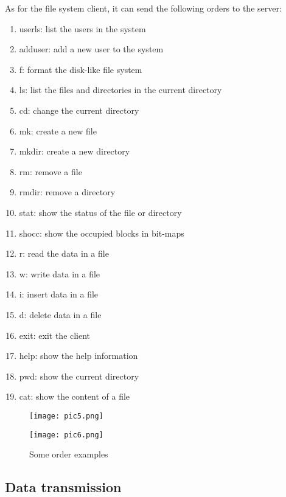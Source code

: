 \documentclass[a4paper]{article}
\begin{document}
As for the file system client, it can send the following orders to the server:
\begin{enumerate}
    \item userls: list the users in the system
    \item adduser: add a new user to the system
    \item f: format the disk-like file system
    \item ls: list the files and directories in the current directory
    \item cd: change the current directory
    \item mk: create a new file
    \item mkdir: create a new directory
    \item rm: remove a file
    \item rmdir: remove a directory
    \item stat: show the status of the file or directory
    \item shocc: show the occupied blocks in bit-maps
    \item r: read the data in a file
    \item w: write data in a file
    \item i: insert data in a file
    \item d: delete data in a file
    \item exit: exit the client
    \item help: show the help information
    \item pwd: show the current directory
    \item cat: show the content of a file
\end{enumerate}
\begin{figure}[h]
    \begin{minipage}[t]{0.5\textwidth}
        \centering
        \texttt{[image: pic5.png]}
        
    \end{minipage}
    \begin{minipage}[t]{0.5\textwidth}
        \centering
        \texttt{[image: pic6.png]}
        
    \end{minipage}
    \caption{Some order examples}
\end{figure}
\subsection{Data transmission}
\end{document}
